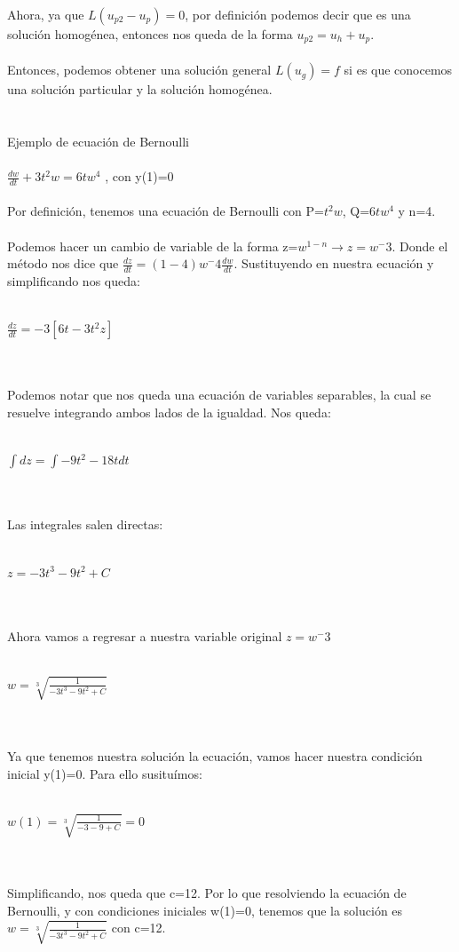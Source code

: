 \documentclass[a4paper,10pt]{article}
\begin{document}
Ahora, ya que $L(u_{p2} - u_p) = 0$, por definición podemos decir que es una solución homogénea, entonces nos queda de la forma $u_{p2} = u_h + u_p$.\\\\
Entonces, podemos obtener una solución general $L(u_g)=f$ si es que conocemos una solución particular y la solución homogénea.
 \\\\\\
Ejemplo de ecuación de Bernoulli\\\\
$\frac{dw}{dt} + 3t^2 w = 6tw^4$ , con y(1)=0\\\\
Por definición, tenemos una ecuación de Bernoulli con P=$t^2w$, Q=$6tw^4$ y n=4.\\\\
Podemos hacer un cambio de variable de la forma z=$w^{1-n} \rightarrow z=w^-3$. Donde el método nos dice que $\frac{dz}{dt} = (1-4)w^-4 \frac{dw}{dt}$. Sustituyendo en nuestra ecuación y simplificando nos queda:\\\\
\centerline{$\frac{dz}{dt} = -3[6t - 3t^2z]$}\\\\
Podemos notar que nos queda una ecuación de variables separables, la cual se resuelve integrando ambos lados de la igualdad. Nos queda:\\\\
\centerline{$\int dz = \int -9t^2 - 18t dt$}\\\\
Las integrales salen directas:\\\\
\centerline{$z = -3t^3 -9t^2  + C$ }\\\\
Ahora vamos a regresar a nuestra variable original $z=w^-3$\\\\
\centerline{$w= \sqrt[3]{\frac{1}{-3t^3 -9t^2  + C}}$}\\\\ 
Ya que tenemos nuestra solución la ecuación, vamos hacer nuestra condición inicial y(1)=0. Para ello susituímos:\\\\
\centerline{$w(1) = \sqrt[3]{\frac{1}{-3 -9  + C}} = 0$}\\\\
Simplificando, nos queda que c=12. Por lo que resolviendo la ecuación de Bernoulli, y con condiciones iniciales w(1)=0, tenemos que la solución es $w= \sqrt[3]{\frac{1}{-3t^3 -9t^2  + C}}$ con c=12.\\\\\\
\end{document}
